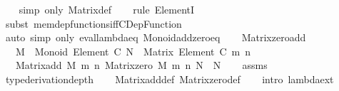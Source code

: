\begin{isabellebody}
\ \ \isamarkupfalse%
\ {\isacharparenleft}{\kern0pt}simp\ only{\isacharcolon}{\kern0pt}\ Matrix{\isacharunderscore}{\kern0pt}def{\isacharparenright}{\kern0pt}\isanewline
\ \ \isamarkupfalse%
\ {\isacharparenleft}{\kern0pt}rule\ ElementI{\isacharparenright}{\kern0pt}\isanewline
\ \ \isamarkupfalse%
\ {\isacharparenleft}{\kern0pt}subst\ mem{\isacharunderscore}{\kern0pt}dep{\isacharunderscore}{\kern0pt}functions{\isacharunderscore}{\kern0pt}iff{\isacharunderscore}{\kern0pt}CDep{\isacharunderscore}{\kern0pt}Function{\isacharparenright}{\kern0pt}\isanewline
\ \ \isamarkupfalse%
\ {\isacharparenleft}{\kern0pt}auto\ simp\ only{\isacharcolon}{\kern0pt}\ eval{\isacharunderscore}{\kern0pt}lambda{\isacharunderscore}{\kern0pt}eq\ Monoid{\isacharunderscore}{\kern0pt}add{\isacharunderscore}{\kern0pt}zero{\isacharunderscore}{\kern0pt}eq{\isacharparenright}{\kern0pt}\isanewline
\ \ \isamarkupfalse%
%
\endisatagproof
{\isafoldproof}%
%
\isadelimproof
\isanewline
%
\endisadelimproof
\isanewline
{}\isamarkupfalse%
\ Matrix{\isacharunderscore}{\kern0pt}zero{\isacharunderscore}{\kern0pt}add{\isacharcolon}{\kern0pt}\isanewline
\ \ \ {\isachardoublequoteopen}M\ {\isacharcolon}{\kern0pt}\ Monoid\ {\isacharparenleft}{\kern0pt}Element\ C{\isacharparenright}{\kern0pt}{\isachardoublequoteclose}\ {\isachardoublequoteopen}N\ {\isacharcolon}{\kern0pt}\ Matrix\ {\isacharparenleft}{\kern0pt}Element\ C{\isacharparenright}{\kern0pt}\ m\ n{\isachardoublequoteclose}\isanewline
\ \ \ {\isachardoublequoteopen}Matrix{\isacharunderscore}{\kern0pt}add\ M\ m\ n\ {\isacharparenleft}{\kern0pt}Matrix{\isacharunderscore}{\kern0pt}zero\ M\ m\ n{\isacharparenright}{\kern0pt}\ N\ {\isacharequal}{\kern0pt}\ N{\isachardoublequoteclose}\isanewline
%
\isadelimproof
\ \ %
\endisadelimproof
%
\isatagproof
{}\isamarkupfalse%
\ assms\ \isamarkupfalse%
\ {\isacharbrackleft}{\kern0pt}{\isacharbrackleft}{\kern0pt}type{\isacharunderscore}{\kern0pt}derivation{\isacharunderscore}{\kern0pt}depth{\isacharequal}{\kern0pt}{}{\isacharbrackright}{\kern0pt}{\isacharbrackright}{\kern0pt}\isanewline
\ \ \isamarkupfalse%
\ Matrix{\isacharunderscore}{\kern0pt}add{\isacharunderscore}{\kern0pt}def\ Matrix{\isacharunderscore}{\kern0pt}zero{\isacharunderscore}{\kern0pt}def\isanewline
\ \ \isamarkupfalse%
\ {\isacharparenleft}{\kern0pt}intro\ lambda{\isacharunderscore}{\kern0pt}ext{\isacharparenright}{\kern0pt}\isanewline

\end{isabellebody}
